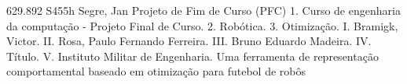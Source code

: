 \documentclass[
  12pt,				%
  oneside,			%
  a4paper,			%
  english,			%
  brazil,				%
]{ime-abntex2}
\begin{document}


\imprimircapa
%

\imprimirfolhaderosto*
%


%
%     
\imprimirfichacatalografica
{629.892}
{S455h}
{Segre, Jan}
{Projeto de Fim de Curso (PFC)}
{%
  1. Curso de engenharia da computação - Projeto Final de Curso.
  2. Robótica.
  3. Otimização.
  I. Bramigk, Victor.
  II. Rosa, Paulo Fernando Ferreira.
  III. Bruno Eduardo Madeira.
  IV. Título.
  V. Instituto Militar de Engenharia.
}
{Uma ferramenta de representação comportamental baseado em otimização
para futebol de robôs}

%
%
%
%
\end{document}
